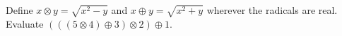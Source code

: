 Define $x\otimes y=\sqrt{x^2-y}$ and $x\oplus y=\sqrt{x^2+y}$ wherever the radicals are real. Evaluate $(((5\otimes4)\oplus3)\otimes2)\oplus1$.
